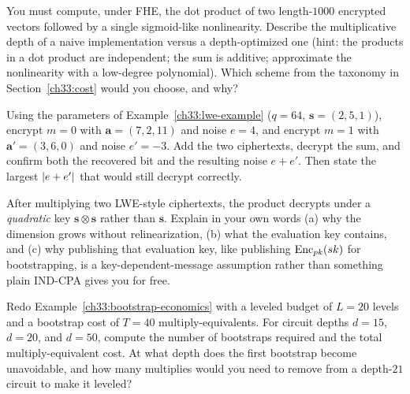 \begin{exercise}
You must compute, under FHE, the dot product of two length-$1000$ encrypted vectors followed by a single sigmoid-like nonlinearity. Describe the multiplicative depth of a naive implementation versus a depth-optimized one (hint: the products in a dot product are independent; the sum is additive; approximate the nonlinearity with a low-degree polynomial). Which scheme from the taxonomy in Section~\ref{ch33:cost} would you choose, and why?
\end{exercise}

\begin{exercise}
Using the parameters of Example~\ref{ch33:lwe-example} ($q=64$, $\mathbf{s}=(2,5,1)$), encrypt $m=0$ with $\mathbf{a}=(7,2,11)$ and noise $e=4$, and encrypt $m=1$ with $\mathbf{a}'=(3,6,0)$ and noise $e'=-3$. Add the two ciphertexts, decrypt the sum, and confirm both the recovered bit and the resulting noise $e+e'$. Then state the largest $\lvert e+e'\rvert$ that would still decrypt correctly.
\end{exercise}

\begin{exercise}
After multiplying two LWE-style ciphertexts, the product decrypts under a \emph{quadratic} key $\mathbf{s}\otimes\mathbf{s}$ rather than $\mathbf{s}$. Explain in your own words (a) why the dimension grows without relinearization, (b) what the evaluation key contains, and (c) why publishing that evaluation key, like publishing $\operatorname{Enc}_{pk}(sk)$ for bootstrapping, is a key-dependent-message assumption rather than something plain IND-CPA gives you for free.
\end{exercise}

\begin{exercise}
Redo Example~\ref{ch33:bootstrap-economics} with a leveled budget of $L=20$ levels and a bootstrap cost of $T=40$ multiply-equivalents. For circuit depths $d = 15$, $d = 20$, and $d = 50$, compute the number of bootstraps required and the total multiply-equivalent cost. At what depth does the first bootstrap become unavoidable, and how many multiplies would you need to remove from a depth-$21$ circuit to make it leveled?
\end{exercise}
